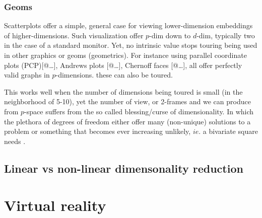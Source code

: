 \documentclass{monashthesis}
\begin{document}
\subsubsection{Geoms}\label{geoms}

Scatterplots offer a simple, general case for viewing lower-dimension
embeddings of higher-dimensions. Such visualization offer \(p\)-dim down
to \(d\)-dim, typically two in the case of a standard monitor. Yet, no
intrinsic value stops touring being used in other graphics or geoms
(geometrics). For instance using parallel coordinate plots
(PCP){[}@\ldots{}{]}, Andrews plots {[}@\ldots{}{]}, Chernoff faces
{[}@\ldots{}{]}, all offer perfectly valid graphs in \(p\)-dimensions.
these can also be toured.

This works well when the number of dimensions being toured is small (in
the neighborhood of 5-10), yet the number of view, or 2-frames and we
can produce from \(p\)-space suffers from the so called blessing/curse
of dimensionality. In which the plethora of degrees of freedom either
offer many (non-unique) solutions to a problem or something that becomes
ever increasing unlikely, \(ie.\) a bivariate square needs .

\subsection{Linear vs non-linear dimensonality
reduction}\label{linear-vs-non-linear-dimensonality-reduction}

\section{Virtual reality}\label{virtual-reality}

\printbibliography[heading=bibintoc]
\end{document}
